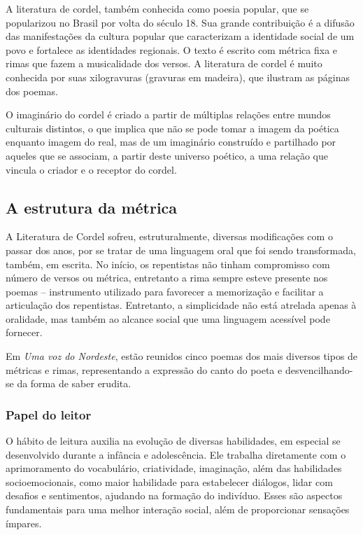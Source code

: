\documentclass[12pt]{extarticle}
\begin{document}
A literatura de cordel, também conhecida como poesia popular, que se
popularizou no Brasil por volta do século 18. Sua grande contribuição é
a difusão das manifestações da cultura popular que caracterizam a
identidade social de um povo e fortalece as identidades regionais. O
texto é escrito com métrica fixa e rimas que fazem a musicalidade dos
versos. A literatura de cordel é muito conhecida por suas xilogravuras
(gravuras em madeira), que ilustram as páginas dos poemas.

O imaginário do cordel é criado a partir de múltiplas relações entre
mundos culturais distintos, o que implica que não se pode tomar a imagem
da poética enquanto imagem do real, mas de um imaginário construído e
partilhado por aqueles que se associam, a partir deste universo poético,
a uma relação que vincula o criador e o receptor do cordel.

\subsection{A estrutura da métrica}

A Literatura de Cordel sofreu, estruturalmente, diversas modificações
com o passar dos anos, por se tratar de uma linguagem oral que foi sendo
transformada, também, em escrita. No início, os repentistas não tinham
compromisso com número de versos ou métrica, entretanto a rima sempre
esteve presente nos poemas -- instrumento utilizado para favorecer a
memorização e facilitar a articulação dos repentistas. Entretanto, a
simplicidade não está atrelada apenas à oralidade, mas também ao alcance
social que uma linguagem acessível pode fornecer.

Em \emph{Uma voz do Nordeste}, estão reunidos cinco poemas dos mais
diversos tipos de métricas e rimas, representando a expressão do canto
do poeta e desvencilhando-se da forma de saber erudita.

\subsubsection{Papel do leitor}

O hábito de leitura auxilia na evolução de diversas habilidades, em
especial se desenvolvido durante a infância e adolescência. Ele trabalha
diretamente com o aprimoramento do vocabulário, criatividade,
imaginação, além das habilidades socioemocionais, como maior habilidade
para estabelecer diálogos, lidar com desafios e sentimentos, ajudando na
formação do indivíduo. Esses são aspectos fundamentais para uma melhor
interação social, além de proporcionar sensações ímpares.
\end{document}
